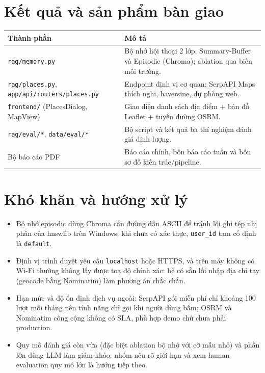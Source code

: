 \documentclass[11pt]{article}
\begin{document}
\section{Kết quả và sản phẩm bàn giao}
\begin{table}[H]
\centering\small
\begin{tabular}{@{}lp{8.7cm}@{}}
\toprule
Thành phần & Mô tả \\
\midrule
\texttt{rag/memory.py} & Bộ nhớ hội thoại 2 lớp: Summary-Buffer và Episodic (Chroma); ablation qua biến môi trường. \\
\texttt{rag/places.py}, \texttt{app/api/routers/places.py} & Endpoint định vị cơ quan: SerpAPI Maps thích nghi, haversine, dự phòng web. \\
\texttt{frontend/} (PlacesDialog, MapView) & Giao diện danh sách địa điểm + bản đồ Leaflet + tuyến đường OSRM. \\
\texttt{rag/eval/*}, \texttt{data/eval/*} & Bộ script và kết quả ba thí nghiệm đánh giá định lượng. \\
Bộ báo cáo PDF & Báo cáo chính, bốn báo cáo tuần và bốn sơ đồ kiến trúc/pipeline. \\
\bottomrule
\end{tabular}
\end{table}

\section{Khó khăn và hướng xử lý}
\begin{itemize}
  \item Bộ nhớ episodic dùng Chroma cần đường dẫn ASCII để tránh lỗi ghi tệp nhị phân của
        hnswlib trên Windows; khi chưa có xác thực, \texttt{user\_id} tạm cố định là
        \texttt{default}.
  \item Định vị trình duyệt yêu cầu \texttt{localhost} hoặc HTTPS, và trên máy không có Wi-Fi
        thường không lấy được toạ độ chính xác: hệ có sẵn lối nhập địa chỉ tay (geocode bằng
        Nominatim) làm phương án chắc chắn.
  \item Hạn mức và độ ổn định dịch vụ ngoài: SerpAPI gói miễn phí chỉ khoảng 100 lượt mỗi
        tháng nên tính năng chỉ gọi khi người dùng bấm; OSRM và Nominatim công cộng không có
        SLA, phù hợp demo chứ chưa phải production.
  \item Quy mô đánh giá còn vừa (đặc biệt ablation bộ nhớ với cỡ mẫu nhỏ) và phần lớn dùng LLM
        làm giám khảo: nhóm nêu rõ giới hạn và xem human evaluation quy mô lớn là hướng tiếp theo.
\end{itemize}
\end{document}
